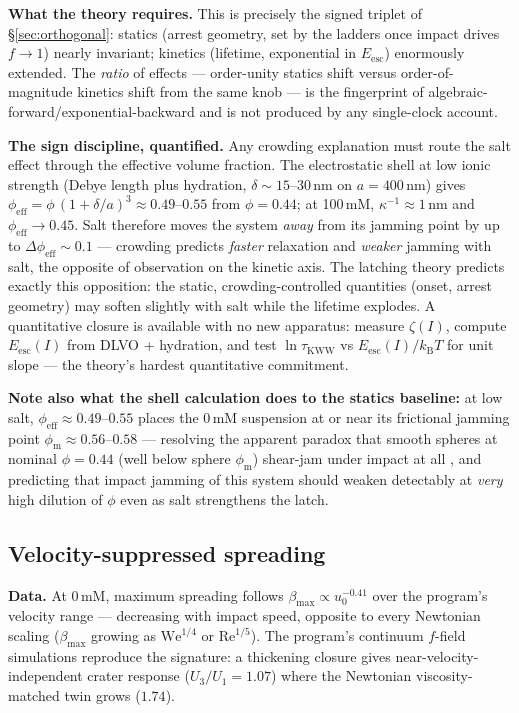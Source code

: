 \documentclass[11pt]{article}
\newcommand{\phiM}{\phi_{\mathrm{m}}}
\begin{document}
\textbf{What the theory requires.} This is precisely the signed triplet of \S\ref{sec:orthogonal}: statics (arrest geometry, set by the ladders once impact drives $f\to1$) nearly invariant; kinetics (lifetime, exponential in $E_{\mathrm{esc}}$) enormously extended. The \emph{ratio} of effects --- order-unity statics shift versus order-of-magnitude kinetics shift from the same knob --- is the fingerprint of algebraic-forward/exponential-backward and is not produced by any single-clock account.

\textbf{The sign discipline, quantified.} Any crowding explanation must route the salt effect through the effective volume fraction. The electrostatic shell at low ionic strength (Debye length plus hydration, $\delta \sim 15$--$30$\,nm on $a = 400$\,nm) gives $\phi_{\mathrm{eff}} = \phi\,(1+\delta/a)^{3} \approx 0.49$--$0.55$ from $\phi = 0.44$; at 100\,mM, $\kappa^{-1} \approx 1$\,nm and $\phi_{\mathrm{eff}} \to 0.45$. Salt therefore moves the system \emph{away} from its jamming point by up to $\Delta\phi_{\mathrm{eff}} \sim 0.1$ --- crowding predicts \emph{faster} relaxation and \emph{weaker} jamming with salt, the opposite of observation on the kinetic axis. The latching theory predicts exactly this opposition: the static, crowding-controlled quantities (onset, arrest geometry) may soften slightly with salt while the lifetime explodes. A quantitative closure is available with no new apparatus: measure $\zeta(I)$, compute $E_{\mathrm{esc}}(I)$ from DLVO + hydration, and test $\ln\tau_{\mathrm{KWW}}$ vs $E_{\mathrm{esc}}(I)/k_{\mathrm{B}}T$ for unit slope --- the theory's hardest quantitative commitment.

\textbf{Note also what the shell calculation does to the statics baseline:} at low salt, $\phi_{\mathrm{eff}} \approx 0.49$--$0.55$ places the 0\,mM suspension at or near its frictional jamming point $\phiM \approx 0.56$--$0.58$ --- resolving the apparent paradox that smooth spheres at nominal $\phi=0.44$ (well below sphere $\phiM$) shear-jam under impact at all \cite{shah2022}, and predicting that impact jamming of this system should weaken detectably at \emph{very} high dilution of $\phi$ even as salt strengthens the latch.

\subsection{Velocity-suppressed spreading}
\textbf{Data.} At 0\,mM, maximum spreading follows $\beta_{\max} \propto u_{0}^{-0.41}$ over the program's velocity range --- decreasing with impact speed, opposite to every Newtonian scaling ($\beta_{\max}$ growing as $\mathrm{We}^{1/4}$ or $\mathrm{Re}^{1/5}$). The program's continuum $f$-field simulations reproduce the signature: a thickening closure gives near-velocity-independent crater response ($U_{3}/U_{1} = 1.07$) where the Newtonian viscosity-matched twin grows ($1.74$).
\end{document}
